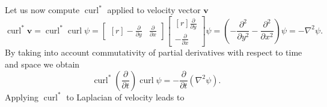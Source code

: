 \documentclass{article}
\numberwithin{equation}{section}
\begin{document}
Let us now compute $\operatorname{curl}^*$ applied to velocity vector $\boldsymbol{v}$
\begin{equation}\label{eqn:curl-adj-curl}
	\operatorname{curl}^*\boldsymbol{v}=\operatorname{curl}^*\operatorname{curl}\psi=
	\begin{bmatrix*}[r]
	-\frac{\partial}{\partial y}&
	\frac{\partial}{\partial x}
	\end{bmatrix*}
	\begin{bmatrix*}[r]
	\frac{\partial}{\partial y} \\
	-\frac{\partial}{\partial x}
	\end{bmatrix*}
	\psi
	=\left(-\frac{\partial^2}{\partial y^2} -\frac{\partial^2 }{\partial x^2}\right) \psi =-\nabla^2 \psi.
\end{equation}
By taking into account commutativity of partial derivatives with respect to time and space we obtain
\begin{equation}\label{eqn:transient-laplacian-psi}
	\operatorname{curl}^*\left(\frac{\partial}{\partial t}\right)\operatorname{curl}\psi=-\frac{\partial}{\partial t}\left(\nabla^2 \psi \right).
\end{equation}
Applying $\operatorname{curl}^*$ to Laplacian of velocity leads to
\end{document}
